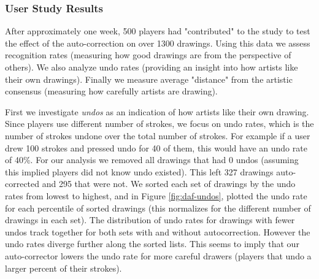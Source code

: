 \subsubsection {User Study Results}

After approximately one week, 500 players had "contributed" to the study to test the effect of the auto-correction on over 1300 drawings. Using this data we assess recognition rates (measuring how good drawings are from the perspective of others). We also analyze undo rates (providing an insight into how artists like their own drawings). Finally we measure average "distance" from the artistic consensus (measuring how carefully artists are drawing).



First we investigate {\em undos} as an indication of how artists like their own drawing. Since players use different number
of strokes, we focus on undo rates, which is the number of strokes undone over the total number of strokes. For example if
a user drew 100 strokes and pressed undo for 40 of them, this would have an undo rate of 40\%. For our analysis we removed
all drawings that had 0 undos (assuming this implied players did not know undo existed). This left 327 drawings auto-corrected
 and 295 that were not. We sorted each set of drawings by the undo rates from lowest to highest, and in Figure
\ref{fig:daf-undos}, plotted the undo rate for each percentile of sorted drawings (this normalizes for the different
number of drawings in each set). The distribution of undo rates for drawings with fewer undos track together for both
sets with and without autocorrection. However the undo rates diverge further along the sorted lists. This seems to imply
that our auto-corrector lowers the undo rate for more careful drawers (players that undo a larger percent of their
strokes).

